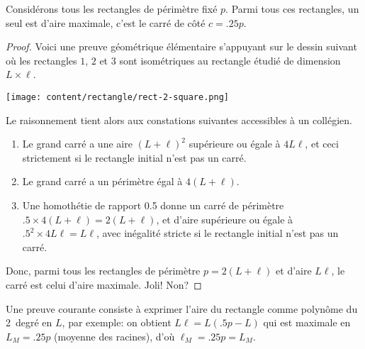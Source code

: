 \begin{fact} \label{iso-rect}
	Considérons tous les rectangles de périmètre fixé $p$. Parmi tous ces rectangles, un seul est d'aire maximale, c'est le carré de côté $c = \num{.25} p$.
\end{fact}


\begin{proof}
	Voici une preuve géométrique élémentaire s'appuyant sur le dessin suivant où les rectangles $1$, $2$ et $3$ sont isométriques au rectangle étudié de dimension $L \times \ell$.

	\begin{center}
		\texttt{[image: content/rectangle/rect-2-square.png]}
	\end{center}
	
	Le raisonnement tient alors aux constations suivantes accessibles à un collégien.
	\begin{enumerate}
		\item Le grand carré a une aire $(L + \ell)^2$ supérieure ou égale à $4 L \ell$, et ceci strictement si le rectangle initial n'est pas un carré.

		\item Le grand carré a un périmètre égal à $4 (L + \ell)$.

		\item Une homothétie de rapport \num{.5} donne un carré 
		de périmètre $\num{.5} \times 4 (L + \ell) = 2 (L + \ell)$,
		et d'aire supérieure ou égale à $\num{.5}^2 \times 4 L \ell =  L \ell$, avec inégalité stricte si le rectangle initial n'est pas un carré.
	\end{enumerate}
	
	Donc, parmi tous les rectangles de périmètre $p = 2 (L + \ell)$ et d'aire $L \ell$, le carré est celui d'aire maximale. Joli! Non?
\end{proof}




\begin{remark}
	Une preuve courante consiste à exprimer l'aire du rectangle comme polynôme du 2\ieme\ degré en $L$, par exemple: on obtient $L \ell = L (\num{.5} p - L)$ qui est maximale en $L_M = \num{.25} p$ (moyenne des racines), d'où $\ell_M = \num{.25} p = L_M$.
\end{remark}




